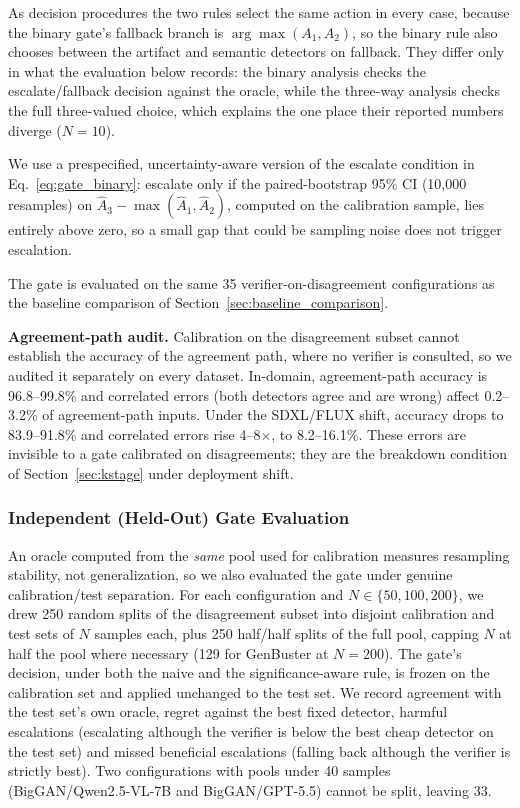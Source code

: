 \documentclass{ieeeaccess}
\begin{document}
As decision procedures the two rules select the same action in every case, because the binary gate's fallback branch is $\arg\max(A_1, A_2)$, so the binary rule also chooses between the artifact and semantic detectors on fallback. They differ only in what the evaluation below records: the binary analysis checks the escalate/fallback decision against the oracle, while the three-way analysis checks the full three-valued choice, which explains the one place their reported numbers diverge ($N{=}10$).

We use a prespecified, uncertainty-aware version of the escalate condition in Eq.~\eqref{eq:gate_binary}: escalate only if the paired-bootstrap 95\% CI (10{,}000 resamples) on $\hat A_3 - \max(\hat A_1, \hat A_2)$, computed on the calibration sample, lies entirely above zero, so a small gap that could be sampling noise does not trigger escalation.

The gate is evaluated on the same 35 verifier-on-disagreement configurations as the baseline comparison of Section~\ref{sec:baseline_comparison}.

\textbf{Agreement-path audit.} Calibration on the disagreement subset cannot establish the accuracy of the agreement path, where no verifier is consulted, so we audited it separately on every dataset. In-domain, agreement-path accuracy is 96.8--99.8\% and correlated errors (both detectors agree and are wrong) affect 0.2--3.2\% of agreement-path inputs. Under the SDXL/FLUX shift, accuracy drops to 83.9--91.8\% and correlated errors rise 4--8$\times$, to 8.2--16.1\%. These errors are invisible to a gate calibrated on disagreements; they are the breakdown condition of Section~\ref{sec:kstage} under deployment shift.

\subsubsection{Independent (Held-Out) Gate Evaluation}
\label{sec:gate_holdout}

An oracle computed from the \emph{same} pool used for calibration measures resampling stability, not generalization, so we also evaluated the gate under genuine calibration/test separation. For each configuration and $N \in \{50, 100, 200\}$, we drew 250 random splits of the disagreement subset into disjoint calibration and test sets of $N$ samples each, plus 250 half/half splits of the full pool, capping $N$ at half the pool where necessary (129 for GenBuster at $N{=}200$). The gate's decision, under both the naive and the significance-aware rule, is frozen on the calibration set and applied unchanged to the test set. We record agreement with the test set's own oracle, regret against the best fixed detector, harmful escalations (escalating although the verifier is below the best cheap detector on the test set) and missed beneficial escalations (falling back although the verifier is strictly best). Two configurations with pools under 40 samples (BigGAN/Qwen2.5-VL-7B and BigGAN/GPT-5.5) cannot be split, leaving 33.
\end{document}
